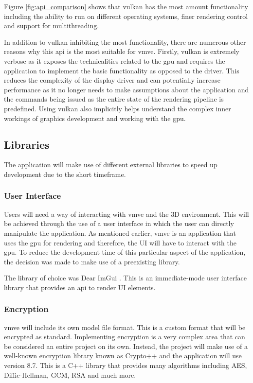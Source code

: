 \documentclass[11pt]{article}
\begin{document}
Figure \ref{fig:api_comparison} shows that \gls*{vulkan} has the most amount
functionality including the ability to run on different operating systems, 
finer rendering control and support for multithreading.

In addition to \gls*{vulkan} inhibiting the most functionality, there are
numerous other reasons why this \gls*{api} is the most suitable for \gls*{vmve}.
Firstly, \gls*{vulkan} is extremely verbose as it exposes the technicalities
related to the \gls*{gpu} and requires the application to implement the basic
functionality as opposed to the driver. This reduces the complexity of the
display driver and can potentially increase performance as it no longer needs to
make assumptions about the application and the commands being issued as the
entire state of the rendering pipeline is predefined. Using \gls*{vulkan} also
implicitly helps understand the complex inner workings of graphics development
and working with the \gls*{gpu}.

\subsection{Libraries}
The application will make use of different external libraries to speed up 
development due to the short timeframe.

\subsubsection{User Interface}
Users will need a way of interacting with \gls*{vmve} and the 3D environment.
This will be achieved through the use of a user interface in which the user can
directly manipulate the application. As mentioned earlier, \gls*{vmve} is an
application that uses the \gls*{gpu} for rendering and therefore, the UI will
have to interact with the \gls*{gpu}. To reduce the development time of this
particular aspect of the application, the decision was made to make use of a
preexisting library.

The library of choice was Dear ImGui \cite{imgui}. This is an immediate-mode
user interface library that provides an \gls*{api} to render UI elements. 

\subsubsection{Encryption} \label{custom_file_format} \gls*{vmve} will include
its own model file format. This is a custom format that will be encrypted as
standard. Implementing encryption is a very complex area that can be considered
an entire project on its own. Instead, the project will make use of a well-known
encryption library known as Crypto++ \cite{cryptopp} and the application will
use version 8.7. This is a C++ library that provides many algorithms including
AES, Diffie-Hellman, GCM, RSA and much more.
\end{document}
